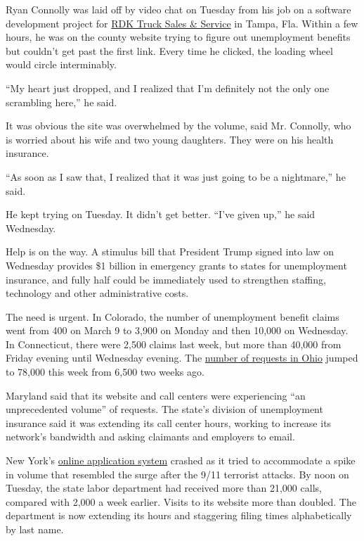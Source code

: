 Ryan Connolly was laid off by video chat on Tuesday from his job on a
software development project for \href{https://www.rdk.com/}{RDK Truck
Sales \& Service} in Tampa, Fla. Within a few hours, he was on the
county website trying to figure out unemployment benefits but couldn't
get past the first link. Every time he clicked, the loading wheel would
circle interminably.

``My heart just dropped, and I realized that I'm definitely not the only
one scrambling here,'' he said.

It was obvious the site was overwhelmed by the volume, said Mr.
Connolly, who is worried about his wife and two young daughters. They
were on his health insurance.

``As soon as I saw that, I realized that it was just going to be a
nightmare,'' he said.

He kept trying on Tuesday. It didn't get better. ``I've given up,'' he
said Wednesday.

Help is on the way. A stimulus bill that President Trump signed into law
on Wednesday provides \$1 billion in emergency grants to states for
unemployment insurance, and fully half could be immediately used to
strengthen staffing, technology and other administrative costs.

The need is urgent. In Colorado, the number of unemployment benefit
claims went from 400 on March 9 to 3,900 on Monday and then 10,000 on
Wednesday. In Connecticut, there were 2,500 claims last week, but more
than 40,000 from Friday evening until Wednesday evening. The
\href{https://twitter.com/GovMikeDeWine/status/1240352256152809473?s=20}{number
of requests in Ohio} jumped to 78,000 this week from 6,500 two weeks
ago.

Maryland said that its website and call centers were experiencing ``an
unprecedented volume'' of requests. The state's division of unemployment
insurance said it was extending its call center hours, working to
increase its network's bandwidth and asking claimants and employers to
email.

New York's
\href{https://www.nytimes3xbfgragh.onion/2020/03/16/nyregion/coronavirus-new-york-update.html\#link-1c0b3898}{online
application system} crashed as it tried to accommodate a spike in volume
that resembled the surge after the 9/11 terrorist attacks. By noon on
Tuesday, the state labor department had received more than 21,000 calls,
compared with 2,000 a week earlier. Visits to its website more than
doubled. The department is now extending its hours and staggering filing
times alphabetically by last name.

